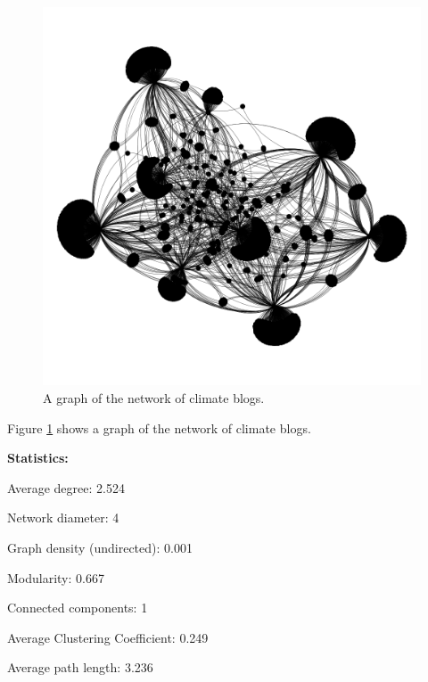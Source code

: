 \documentclass[11pt]{article}
\begin{document}
\subsection{}
\begin{figure}
  \includegraphics[width=\linewidth]{Figure_2.png}
  \caption{A graph of the network of climate blogs.}
  \label{fig:graph}
\end{figure}

Figure \ref{fig:graph} shows a graph of the network of climate blogs.

\textbf{}
\newline
\textbf{Statistics:} \hspace{0pt}

Average degree: \hfill 2.524

Network diameter: \hfill 4

Graph density (undirected): \hfill 0.001

Modularity: \hfill 0.667

Connected components: \hfill 1

Average Clustering Coefficient: \hfill 0.249

Average path length: \hfill 3.236

\subsection{}
\end{document}
